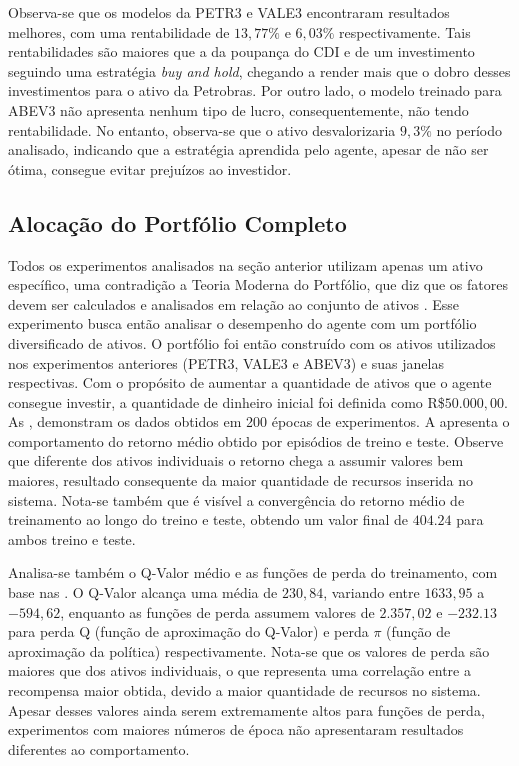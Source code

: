Observa-se que os modelos da PETR3 e VALE3 encontraram resultados melhores, com uma rentabilidade de $13,77\%$ e $6,03\%$ respectivamente. Tais rentabilidades são maiores que a da poupança do CDI e de um investimento seguindo uma estratégia \emph{buy and hold}, chegando a render mais que o dobro desses investimentos para o ativo da Petrobras. Por outro lado, o modelo treinado para ABEV3 não apresenta nenhum tipo de lucro, consequentemente, não tendo rentabilidade. No entanto, observa-se que o ativo desvalorizaria $9,3\%$ no período analisado, indicando que a estratégia aprendida pelo agente, apesar de não ser ótima, consegue evitar prejuízos ao investidor.

\subsection{Alocação do Portfólio Completo}

Todos os experimentos analisados na seção anterior utilizam apenas um ativo específico, uma contradição a Teoria Moderna do Portfólio, que diz que os fatores devem ser calculados e analisados em relação ao conjunto de ativos \cite{markowitz}. Esse experimento busca então analisar o desempenho do agente com um portfólio diversificado de ativos. O portfólio foi então construído com os ativos utilizados nos experimentos anteriores (PETR3, VALE3 e ABEV3) e suas janelas respectivas. Com o propósito de aumentar a quantidade de ativos que o agente consegue investir, a quantidade de dinheiro inicial foi definida como R\$$50.000,00$. As , demonstram os dados obtidos em 200 épocas de experimentos. A  apresenta o comportamento do retorno médio obtido por episódios de treino e teste. Observe que diferente dos ativos individuais o retorno chega a assumir valores bem maiores, resultado consequente da maior quantidade de recursos inserida no sistema. Nota-se também que é visível a convergência do retorno médio de treinamento ao longo do treino e teste, obtendo um valor final de $404.24$ para ambos treino e teste.


Analisa-se também o Q-Valor médio e as funções de perda do treinamento, com base nas . O Q-Valor alcança uma média de $230,84$, variando entre $1633,95$ a $-594,62$, enquanto as funções de perda assumem valores de $2.357,02$ e $-232.13$ para perda Q (função de aproximação do Q-Valor) e perda $\pi$ (função de aproximação da política) respectivamente. Nota-se que os valores de perda são maiores que dos ativos individuais, o que representa uma correlação entre a recompensa maior obtida, devido a maior quantidade de recursos no sistema. Apesar desses valores ainda serem extremamente altos para funções de perda, experimentos com maiores números de época não apresentaram resultados diferentes ao comportamento.

